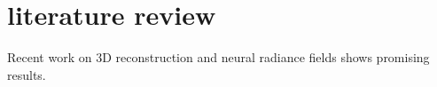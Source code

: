 \chapter{literature review}
\label{ch:literature_review}

Recent work on 3D reconstruction \cite{hong2023lrm} and neural radiance fields \cite{tanc2020nerf} 
shows promising results.
